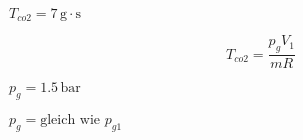 

\item[b)] $T_{co2} = 7 \, \text{g} \cdot \text{s}$
    \item[] \[
    T_{co2} = \frac{p_{g} V_1}{m R}
    \]
    \item[] $p_{g} = 1.5 \, \text{bar}$
    \item[] $p_{g} = \text{gleich wie } p_{g1}$
    \item[] 
